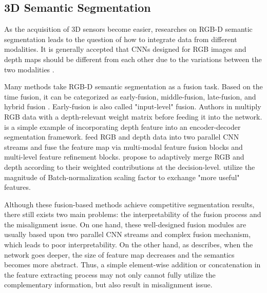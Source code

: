 ﻿\documentclass[journal]{IEEEtran}
\begin{document}
\subsection{3D Semantic Segmentation}
 
    As the acquisition of 3D sensors become easier, researches on RGB-D semantic segmentation \cite{wang2021brief} leads to the question of how to integrate data from different modalities.  It is generally accepted that CNNs designed for RGB images and depth maps should be different from each other due to the variations between the two modalities \cite{xing201925DConv} \cite{2021shapeconv} \cite{chen20193dneighbor}. 
 
    Many methods take RGB-D semantic segmentation as a fusion task. Based on the time fusion, it can be categorized as early-fusion, middle-fusion, late-fusion, and hybrid fusion \cite{zhang2021deep}. Early-fusion is also called "input-level" fusion. Authors in \cite{cao2021rgbxd} multiply RGB data with a depth-relevant weight matrix before feeding it into the network.  \cite{2016fusenet} is a simple example of incorporating depth feature into an encoder-decoder segmentation framework. \cite{park2017rdfnet} feed RGB and depth data into two parallel CNN streams and fuse the feature map via multi-modal feature fusion blocks and multi-level feature refinement blocks. \cite{cheng2017locality} propose to adaptively merge RGB and depth according to their weighted contributions at the decision-level. \cite{2020deep} utilize the magnitude of Batch-normalization scaling factor to exchange "more useful" features. 

    Although these fusion-based methods achieve competitive segmentation results, there still exists two main problems: the interpretability of the fusion process and the misalignment issue. On one hand, these well-designed fusion modules are usually based upon two parallel CNN streams and complex fusion mechanism, which leads to poor interpretability. On the other hand, as \cite{2021global} describes, when the network goes deeper, the size of feature map decreases and the semantics becomes more abstract. Thus, a simple element-wise addition or concatenation in the feature extracting process may not only cannot fully utilize the complementary information, but also result in misalignment issue.
 
\end{document}
